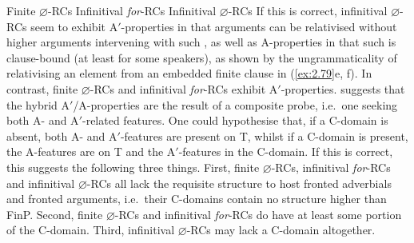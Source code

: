 \documentclass[output=paper]{langsci/langscibook}
\begin{document}
\ea\label{ex:2.77}  Finite $\varnothing$-\glspl{RC}
    \z
\ex\label{ex:2.78}  Infinitival \emph{for}-\glspl{RC}
    \z
\ex\label{ex:2.79}  Infinitival $\varnothing$-\glspl{RC}
    \z
\z
If this is correct, infinitival
$\varnothing${-\glspl{RC} seem to exhibit A$'$-properties in that arguments can
    be relativised without higher arguments intervening with such
    , as well as A-properties in that such  is
clause-bound (at least for some speakers)}, as shown by the ungrammaticality of
relativising an element from an embedded finite clause in (\ref{ex:2.79}e, f). In contrast,
finite $\varnothing${-\glspl{RC} and infinitival} \emph{for}-\glspl{RC} exhibit
A$'$-properties.  \textcite{Longenbaugh2016} suggests that the hybrid
A$'$/A-properties are the result of a composite probe, i.e.\ one seeking both A-
and A$'$-related features. One could hypothesise that, if a C-domain is absent,
both A- and A$'$-features are present on T, whilst if a C-domain is present, the
A-features are on T and the A$'$-features in the C-domain. If this is correct,
this suggests the following three things. First, finite $\varnothing${-RCs,
infinitival} \emph{for}{-\glspl{RC} and infinitival} $\varnothing$-\glspl{RC}
all lack the requisite structure to host fronted adverbials and fronted
arguments, i.e.\ their C-domains contain no structure higher than FinP. Second,
finite $\varnothing$-\glspl{RC} and infinitival \emph{for}-\glspl{RC} do have
at least some portion of the C-domain. Third, infinitival
$\varnothing$-\glspl{RC} may lack a C-domain altogether.
\end{document}
